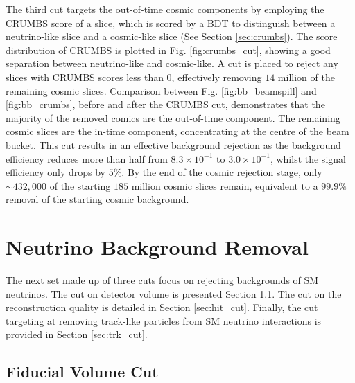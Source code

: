 The third cut targets the out-of-time cosmic components by employing the CRUMBS score of a slice, which is scored by a BDT to distinguish between a neutrino-like slice and a cosmic-like slice (See Section \ref{sec:crumbs}). 
The score distribution of CRUMBS is plotted in Fig. \ref{fig:crumbs_cut}, showing a good separation between neutrino-like and cosmic-like.                                                                        
A cut is placed to reject any slices with CRUMBS scores less than 0, effectively removing $14$ million of the remaining cosmic slices.
Comparison between Fig. \ref{fig:bb_beamspill} and \ref{fig:bb_crumbs}, before and after the CRUMBS cut, demonstrates that the majority of the removed comics are the out-of-time component. 
The remaining cosmic slices are the in-time component, concentrating at the centre of the beam bucket.  
This cut results in an effective background rejection as the background efficiency reduces more than half from $8.3 \times 10^{-1}$ to $3.0 \times 10^{-1}$, whilst the signal efficiency only drops by $5 \%$.
By the end of the cosmic rejection stage, only $\sim432,000$ of the starting $185$ million cosmic slices remain, equivalent to a $99.9\%$ removal of the starting cosmic background.


\section{Neutrino Background Removal}
\label{sec:sm_rej}

The next set made up of three cuts focus on rejecting backgrounds of SM neutrinos.
The cut on detector volume is presented Section \ref{sec:fv_cut}.
The cut on the reconstruction quality is detailed in Section \ref{sec:hit_cut}.
Finally, the cut targeting at removing track-like particles from SM neutrino interactions is provided in Section \ref{sec:trk_cut}.

\subsection{Fiducial Volume Cut}
\label{sec:fv_cut}

